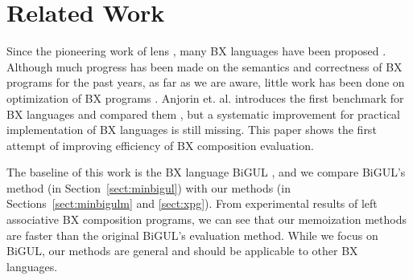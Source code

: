 \section{Related Work} \label{sect:related}


Since the pioneering work of lens \cite{Foster:2007:CBT:1232420.1232424}, many BX languages have been proposed \cite{Bohannon06relationallenses:, Bohannon:2008:BRL:1328438.1328487,Buchmann:2018:BFI:3362232.3362263,Ko:2016:BFV:2847538.2847544,LeblebiciAS14,Samimi-Dehkordi18,Cicchetti2011,Hinkel:2019:CPB:3318595.3318634}.
Although much progress has been made on the semantics and correctness of BX programs for the past years, as far as we are aware, little work has been done on optimization of BX programs \cite{Horn:2018:IRL:3243631.3236769}. Anjorin et. al. introduces the first benchmark for BX languages and compared them \cite{Anjorin2019}, but a systematic improvement for practical implementation of BX languages is still missing. This paper shows the first attempt of improving efficiency of BX composition evaluation.

The baseline of this work is the BX language BiGUL \cite{Ko:2016:BFV:2847538.2847544, Ko:2017:ABB:3177123.3158129}, and we compare BiGUL's method (in Section~\ref{sect:minbigul}) with our methods (in Sections~\ref{sect:minbigulm} and \ref{sect:xpg}). From experimental results of left associative BX composition programs, we can see that our memoization methods are faster than the original BiGUL's evaluation method.
While we focus on BiGUL, our methods are general and should be applicable to other BX languages.




